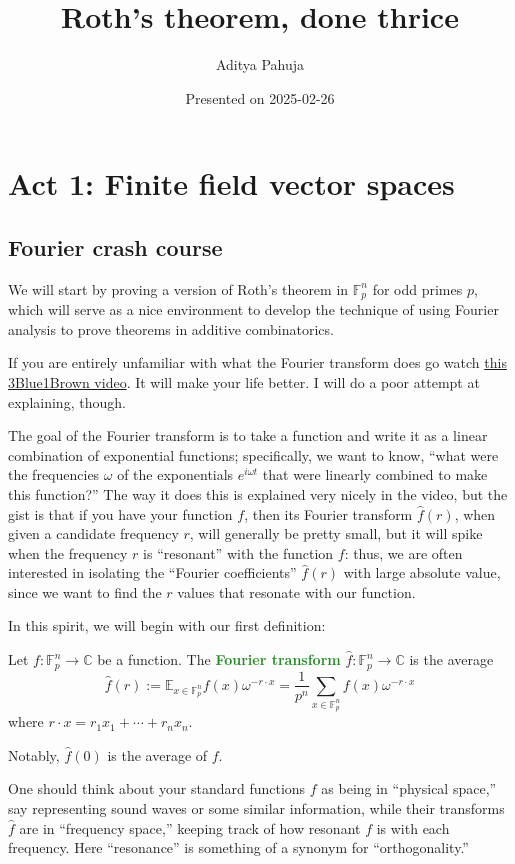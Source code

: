 \documentclass[10pt]{scrartcl}
\title{\vspace{-2.0cm} Roth's theorem, done thrice}
\author{\large Aditya Pahuja}
\date{\large Presented on 2025-02-26}
\providecommand{\CC}{\mathbb C}
\providecommand{\EE}{\mathbb E}
\providecommand{\FF}{\mathbb F}
\renewcommand{\hat}{\widehat}
\providecommand{\vocab}[1]{{\textbf{\textcolor{ForestGreen}{#1}}}}
\begin{document}
\maketitle
\tableofcontents
\pagebreak

\section{Act 1: Finite field vector spaces}
\subsection{Fourier crash course}
We will start by proving a version of Roth's theorem in
$\FF_p^n$ for odd primes $p$, which will serve as a nice environment to develop
the technique of using Fourier analysis to prove theorems in
additive combinatorics.

If you are entirely unfamiliar with what the Fourier transform does go watch
\href{https://www.youtube.com/watch?v=spUNpyF58BY}{this 3Blue1Brown video}.
It will make your life better. I will do a poor attempt at explaining, though.

The goal of the Fourier transform is to take a function
and write it as a linear combination of exponential functions;
specifically, we want to know, ``what were the
frequencies $\omega$ of the exponentials $e^{i\omega t}$
that were linearly combined to make this function?''
The way it does this is explained very nicely in the video,
but the gist is that if you have your function $f$,
then its Fourier transform $\hat f(r)$, when given a candidate frequency $r$,
will generally be pretty small, but it will spike when the frequency $r$ is
``resonant'' with the function $f$: thus, we are often interested in isolating
the ``Fourier coefficients'' $\hat f(r)$ with large absolute value,
since we want to find the $r$ values that resonate with our function.

In this spirit, we will begin with our first definition:
\begin{definition}[Fourier transform, $\FF_p^n$]
	Let $f\colon\FF_p^n\to\CC$ be a function. The \vocab{Fourier transform}
	$\hat f\colon\FF_p^n\to\CC$ is the average
	\[\hat f(r) := \EE_{x\in\FF_p^n} f(x)\omega^{-r\cdot x}
	= \frac{1}{p^n}\sum_{x\in\FF_p^n} f(x)\omega^{-r\cdot x}\]
	where $r\cdot x = r_1x_1 + \cdots + r_nx_n$.
\end{definition}

Notably, $\hat f(0)$ is the average of $f$.

One should think about your standard functions $f$ as being
in ``physical space,'' say representing sound waves or some similar information,
while their transforms $\hat f$ are in ``frequency space,''
keeping track of how resonant $f$ is with each frequency.
Here ``resonance'' is something of a synonym for ``orthogonality.''
\end{document}
